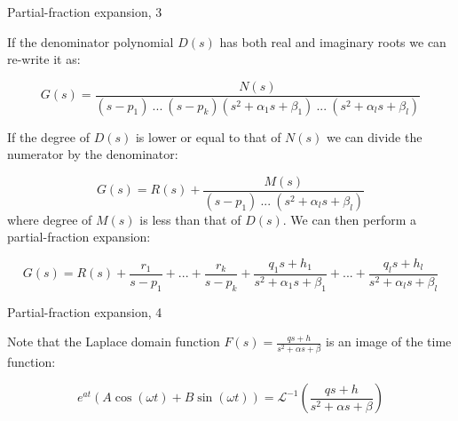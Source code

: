 \documentclass{beamer}
\begin{document}
\begin{frame}{Partial-fraction expansion, 3}
	\begin{flushleft}
		
		If the denominator polynomial $D(s)$ has both real and imaginary roots we can re-write it as:
		
		\begin{equation}
			G(s) = \frac{N(s)}{(s - p_1) \ ... \ (s - p_k)(s^2 + \alpha_1 s + \beta_1) \ ... \ (s^2 + \alpha_l s + \beta_l)}
		\end{equation}		
		
		If the degree of $D(s)$ is lower or equal to that of  $N(s)$ we can divide the numerator by the denominator:
		
		\begin{equation*}
			G(s) = R(s) + \frac{M(s)}{(s - p_1) \ ... \ (s^2 + \alpha_l s + \beta_l)}
		\end{equation*}		
		where degree of $M(s)$ is less than that of $D(s)$. We can then perform a partial-fraction expansion:
		
		\begin{equation*}
			G(s) = R(s) + 
			\frac{r_1}{s - p_1} +  ... + \frac{r_k}{s - p_k} +  \frac{q_1 s+ h_1}{s^2 + \alpha_1 s + \beta_1} +  ... + \frac{q_l s+ h_l}{s^2 + \alpha_l s + \beta_l}
		\end{equation*}		
		
	\end{flushleft}
\end{frame}



\begin{frame}{Partial-fraction expansion, 4}
	\begin{flushleft}
		
		Note that the Laplace domain function $F(s) = \frac{q s+ h}{s^2 + \alpha s + \beta}$ is an image of the time function:
		
		\begin{equation*}
			e^{at}(A \cos(\omega t) + B \sin(\omega t)) 
			 = \mathcal{L}^{-1}\left( \frac{q s+ h}{s^2 + \alpha s + \beta}\right)
		\end{equation*}		
		
		
	\end{flushleft}
\end{frame}
\end{document}
